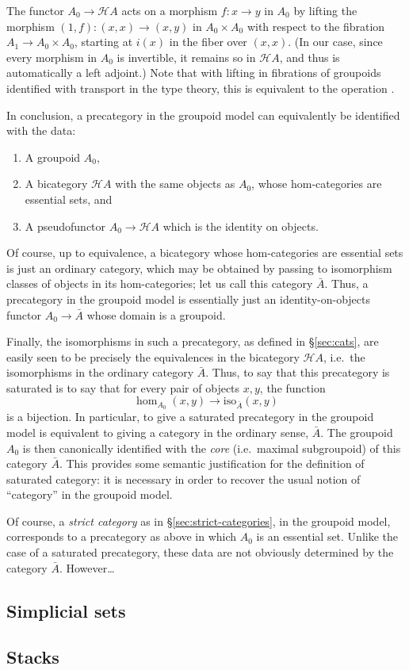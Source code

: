 The functor $A_0 \to \mathcal{H}A$ acts on a morphism $f:x\to y$ in $A_0$ by lifting the morphism $(1,f):(x,x)\to (x,y)$ in $A_0\times A_0$ with respect to the fibration $A_1 \to A_0\times A_0$, starting at $i(x)$ in the fiber over $(x,x)$.
(In our case, since every morphism in $A_0$ is invertible, it remains so in $\mathcal{H}A$, and thus is automatically a left adjoint.)
Note that with lifting in fibrations of groupoids identified with transport in the type theory, this is equivalent to the operation \idtoiso.

In conclusion, a precategory in the groupoid model can equivalently be identified with the data:
\begin{enumerate}
\item A groupoid $A_0$,
\item A bicategory $\mathcal{H}A$ with the same objects as $A_0$, whose hom-categories are essential sets, and
\item A pseudofunctor $A_0 \to \mathcal{H}A$ which is the identity on objects.
\end{enumerate}
Of course, up to equivalence, a bicategory whose hom-categories are essential sets is just an ordinary category, which may be obtained by passing to isomorphism classes of objects in its hom-categories; let us call this category $\bar A$.
Thus, a precategory in the groupoid model is essentially just an identity-on-objects functor $A_0 \to \bar A$ whose domain is a groupoid.

Finally, the isomorphisms in such a precategory, as defined in \S\ref{sec:cats}, are easily seen to be precisely the equivalences in the bicategory $\mathcal{H}A$, i.e.\ the isomorphisms in the ordinary category $\bar A$.
Thus, to say that this precategory is saturated is to say that for every pair of objects $x,y$, the function
\[ \hom_{A_0}(x,y) \to \mathrm{iso}_{\bar A}(x,y) \]
is a bijection.
In particular, to give a saturated precategory in the groupoid model is equivalent to giving a category in the ordinary sense, $\bar A$.
The groupoid $A_0$ is then canonically identified with the \emph{core} (i.e.\ maximal subgroupoid) of this category $\bar A$.
This provides some semantic justification for the definition of saturated category: it is necessary in order to recover the usual notion of ``category'' in the groupoid model.

Of course, a \emph{strict category} as in \S\ref{sec:strict-categories}, in the groupoid model, corresponds to a precategory as above in which $A_0$ is an essential set.
Unlike the case of a saturated precategory, these data are not obviously determined by the category $\bar A$.
However\dots


\subsection{Simplicial sets}
\label{sec:simplicial-sets}


\subsection{Stacks}
\label{sec:stacks}



